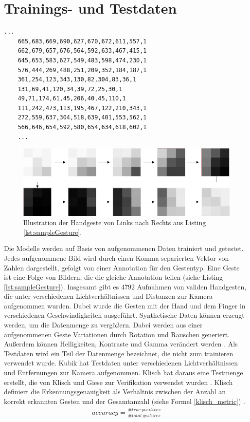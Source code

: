 \section{Trainings- und Testdaten}
\label{sec:synthetischeDaten}
\label{sec:testdaten}
\begin{lstlisting}[label=lst:sampleGesture,caption={Beispiel einer gespeicherten Handgeste von Links nach Rechts.}]
    ...
    665,683,669,690,627,670,672,611,557,1
    662,679,657,676,564,592,633,467,415,1
    645,653,583,627,549,483,598,474,230,1
    576,444,269,488,251,209,352,184,187,1
    361,254,123,343,130,82,304,83,36,1
    131,69,41,120,34,39,72,25,30,1
    49,71,174,61,45,206,40,45,110,1
    111,242,473,113,195,467,122,210,343,1
    272,559,637,304,518,639,401,553,562,1
    566,646,654,592,580,654,634,618,602,1
    ...
\end{lstlisting}
\begin{figure}
    \centering
    \includegraphics[width=\linewidth]{images/sample_gesture_total.jpg}
    \caption{Illustration der Handgeste von Links nach Rechts aus Listing \ref{lst:sampleGesture}.}
    \label{fig:sample_gesture}
\end{figure}
Die Modelle werden auf Basis von aufgenommenen Daten trainiert und getestet. Jedes aufgenommene Bild wird durch einen Komma separierten Vektor von Zahlen dargestellt, gefolgt von einer Annotation für den Gestentyp.
Eine Geste ist eine Folge von Bildern, die die gleiche Annotation teilen (siehe Listing \ref{lst:sampleGesture}). Insgesamt gibt es 4792 Aufnahmen von validen Handgesten, die unter verschiedenen Lichtverhältnissen
und Distanzen zur Kamera aufgenommen wurden. Dabei wurde die Gesten mit der Hand und dem Finger in verschiedenen Geschwindigkeiten ausgeführt.
\newline
\newline
Synthetische Daten können erzeugt werden, um die Datenmenge zu vergößern. Dabei werden aus einer aufgenommenen Geste Variationen durch Rotation und Rauschen generiert. Außerdem können Helligkeiten,
Kontraste und Gamma verändert werden \cite{venzkeArticle}.
\newline
\newline
Als Testdaten wird ein Teil der Datenmenge bezeichnet, die nicht zum trainieren verwendet wurde. Kubik hat Testdaten unter verschiedenen Lichtverhältnissen und Entfernungen zur Kamera aufgenommen. Klisch hat
daraus eine Testmenge erstellt, die von Klisch und Giese zur Verifikation verwendet wurden \cite{klischThesis, gieseThesis}. Klisch definiert die Erkennungsgenauigkeit als Verhältnis zwischen der Anzahl an korrekt
erkannten Gesten und der Gesamtanzahl (siehe Formel \ref{klisch_metric}) \cite{klischThesis}.
\begin{align}
    accuracy = \frac{\#true\ positives}{\#total\ gestures}
    \label{klisch_metric}
\end{align}
